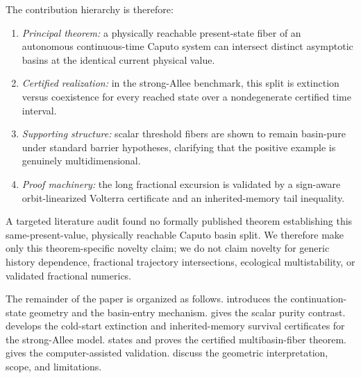 The contribution hierarchy is therefore:
\begin{enumerate}[label=(\arabic*)]
  \item \emph{Principal theorem:} a physically reachable present-state fiber of an autonomous continuous-time Caputo system can intersect distinct asymptotic basins at the identical current physical value.
  \item \emph{Certified realization:} in the strong-Allee benchmark, this split is extinction versus coexistence for every reached state over a nondegenerate certified time interval.
  \item \emph{Supporting structure:} scalar threshold fibers are shown to remain basin-pure under standard barrier hypotheses, clarifying that the positive example is genuinely multidimensional.
  \item \emph{Proof machinery:} the long fractional excursion is validated by a sign-aware orbit-linearized Volterra certificate and an inherited-memory tail inequality.
\end{enumerate}

A targeted literature audit found no formally published theorem establishing this same-present-value, physically reachable Caputo basin split.  We therefore make only this theorem-specific novelty claim; we do not claim novelty for generic history dependence, fractional trajectory intersections, ecological multistability, or validated fractional numerics.

The remainder of the paper is organized as follows.   introduces the continuation-state geometry and the basin-entry mechanism.   gives the scalar purity contrast.   develops the cold-start extinction and inherited-memory survival certificates for the strong-Allee model.   states and proves the certified multibasin-fiber theorem.   gives the computer-assisted validation.   discuss the geometric interpretation, scope, and limitations.
